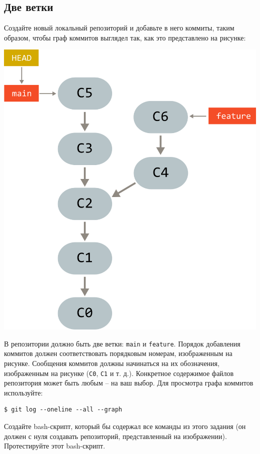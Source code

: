 \documentclass{article}
\begin{document}
\subsection{Две ветки}
Создайте новый локальный репозиторий и добавьте в него коммиты, таким образом, чтобы граф коммитов выглядел так, как это представлено на рисунке:
\begin{center}
\includegraphics[scale=0.9]{../images/two_branches.png}
\end{center}
В репозитории должно быть две ветки: \texttt{main} и \texttt{feature}. Порядок добавления коммитов должен соответствовать порядковым номерам, изображенным на рисунке. Сообщения коммитов должны начинаться на их обозначения, изображенным на рисунке (\texttt{C0}, \texttt{С1} и т. д.). Конкретное содержимое файлов репозитория может быть любым -- на ваш выбор. Для просмотра графа коммитов используйте:
\begin{lstlisting}[style=csMiptBash]
$ git log --oneline --all --graph
\end{lstlisting}
Создайте bash-скрипт, который бы содержал все команды из этого задания (он должен с нуля создавать репозиторий, представленный на изображении). Протестируйте этот bash-скрипт.
\end{document}
